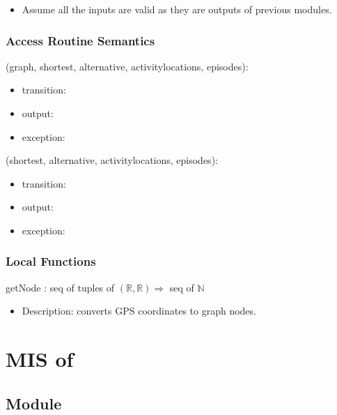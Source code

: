 \documentclass[12pt, titlepage]{article}
\begin{document}
\begin{itemize}
    \item Assume all the inputs are valid as they are outputs of previous modules. 
\end{itemize}

\subsubsection{Access Routine Semantics}

\noindent {}(graph, shortest, alternative, activitylocations, episodes):
\begin{itemize}
\item transition:  
\item output:  
\item exception:  
\end{itemize}

\noindent {}(shortest, alternative, activitylocations, episodes):
\begin{itemize}
\item transition:  
\item output:  
\item exception:  
\end{itemize}

\subsubsection{Local Functions}

getNode : seq of tuples of $(\mathbb{R}, \mathbb{R}) \Rightarrow $ seq of $\mathbb{N}$
\begin{itemize}
    \item Description: converts GPS coordinates to graph nodes. 
\end{itemize}

\newpage

\section{MIS of } \label{Module}

\subsection{Module}
\end{document}
